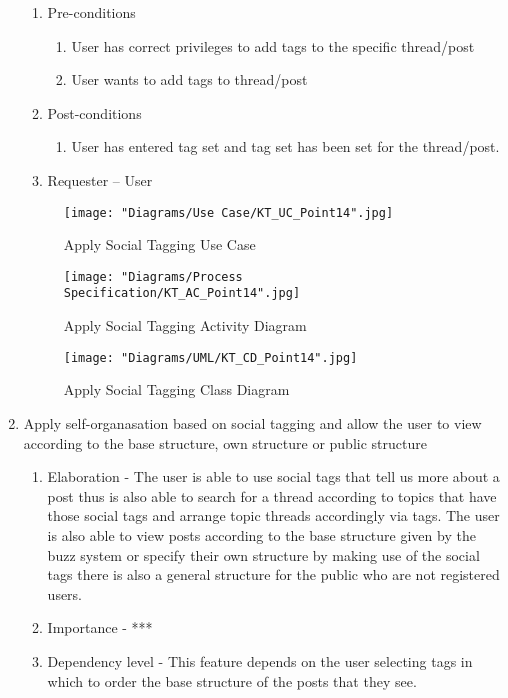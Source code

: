 \documentclass[12pt]{article}
\begin{document}
\begin{enumerate}
\begin{enumerate}
    \item Pre-conditions
    \begin{enumerate}
    	\item User has correct privileges to add tags to the specific thread/post
    	\item User wants to add tags to thread/post
    \end{enumerate}
        \item Post-conditions
    \begin{enumerate}
    	\item User has entered tag set and tag set has been set for the thread/post.
    \end{enumerate}
    \item Requester – User
  \end{enumerate}
\begin{figure}[h]
	\centering
	\texttt{[image: "Diagrams/Use Case/KT\_UC\_Point14".jpg]}
	\caption{Apply Social Tagging Use Case}
\end{figure}
\begin{figure}[h]
	\centering
	\texttt{[image: "Diagrams/Process Specification/KT\_AC\_Point14".jpg]}
	\caption{Apply Social Tagging Activity Diagram}
\end{figure}
\begin{figure}[h]
	\centering
	\texttt{[image: "Diagrams/UML/KT\_CD\_Point14".jpg]}
	\caption{Apply Social Tagging Class Diagram}
\end{figure}
\clearpage %
   \item Apply self-organasation based on social tagging and allow the user to view according to the base structure, own structure or public structure %
  \begin{enumerate}
    \item Elaboration - The user is able to use social tags that tell us more about a post thus is also able to search for a thread according to topics that have those social tags and arrange topic threads accordingly via tags. The user is also able to view posts according to the base structure given by the buzz system or specify their own structure by making use of the social tags there is also a general structure for the public who are not registered users. 
    \item Importance - ***
    \item Dependency level - This feature depends on the user selecting tags in which to order the base structure of the posts that they see.

\end{enumerate}
\end{enumerate}
\end{document}
